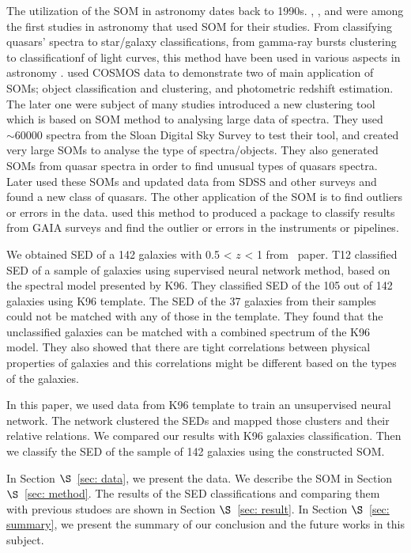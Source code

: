 The utilization of the SOM in astronomy dates back to 1990s. 
\citet[][]{Odewahn92}, \citet[][]{Hernandez94}, and \citet[][]{Murtagh95} were among the first studies in astronomy that used SOM for their studies.
From classifying quasars' spectra to star/galaxy classifications, from gamma-ray bursts clustering to classificationf of light curves, this method have been used in various aspects in astronomy \citep[e.g.][]{Maehoenen95, Miller96,Andreon00,Balastegui01,Rajaniemi02,Brett04,Scaringi09}.
\citet{Geach12} used COSMOS data to demonstrate two of main application of SOMs; object classification and clustering, and photometric redshift estimation. 
The later one were subject of many studies \citep[e.g.][]{Kind14a}
\citet{In12} introduced a new clustering tool which is based on SOM method to analysing large data of spectra.
They used $\sim 60000$ spectra from the Sloan Digital Sky Survey \citep[SDSS;][]{Abazajian09}
to test their tool, and created very large SOMs to analyse the type of spectra/objects.
They also generated SOMs from quasar spectra in order to find unusual types of quasars spectra. Later \citet{Meusinger16} used these SOMs and updated data from SDSS and other surveys and found a new class of quasars.
The other application of the SOM is to find outliers or errors in the data.
\citet{Fustes13} used this method to produced a package to classify results from GAIA surveys and find the outlier or errors in the instruments or pipelines. %




We obtained SED of a 142 galaxies with 0.5 < $z$ < 1 from~\citet[][hereafter T12]{Hossein12} paper.
T12 classified SED of a sample of galaxies using supervised neural network method, based on the spectral model presented by K96.
They classified SED of the 105 out of 142 galaxies using K96 template. 
The SED of the 37 galaxies from their samples could not be matched with any of those in the template. 
They found that the unclassified galaxies can be matched with a combined spectrum of the K96 model. 
They also showed that there are tight correlations between physical properties of galaxies and this correlations might be different based on the types of the galaxies.

In this paper, we used data from K96 template to train an unsupervised neural network. %
The network clustered the SEDs and mapped those clusters and their relative relations.
We compared our results with K96 galaxies classification.
Then we classify the SED of the sample of 142 galaxies using the constructed SOM.
 
 In Section $\S$~\ref{sec: data}, we present the data. We describe the SOM in Section $\S$~\ref{sec: method}. The results of the SED classifications and comparing them with previous studoes are shown in Section $\S$~\ref{sec: result}. In Section $\S$~\ref{sec: summary}, we present the summary of our conclusion and the future works in this subject.
